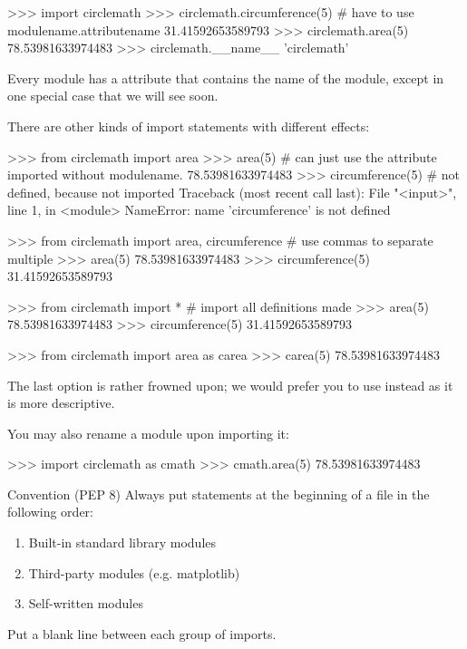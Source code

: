 \documentclass[11pt]{cselabheader}
\begin{document}
{\begin{pyconcode}
>>> import circlemath
>>> circlemath.circumference(5) # have to use modulename.attributename
31.41592653589793
>>> circlemath.area(5)
78.53981633974483
>>> circlemath.__name__
'circlemath'
\end{pyconcode}

Every module has a  attribute that contains the name of
the module, except in one special case that we will see soon.

There are other kinds of import statements with different effects:

\begin{pyconcode}
>>> from circlemath import area
>>> area(5) # can just use the attribute imported without modulename.
78.53981633974483
>>> circumference(5) # not defined, because not imported
Traceback (most recent call last):
  File "<input>", line 1, in <module>
NameError: name 'circumference' is not defined
\end{pyconcode}

\begin{pyconcode}
>>> from circlemath import area, circumference # use commas to separate multiple
>>> area(5)
78.53981633974483
>>> circumference(5)
31.41592653589793
\end{pyconcode}

\begin{pyconcode}
>>> from circlemath import * # import all definitions made
>>> area(5)
78.53981633974483
>>> circumference(5)
31.41592653589793
\end{pyconcode}

\begin{pyconcode}
>>> from circlemath import area as carea
>>> carea(5)
78.53981633974483
\end{pyconcode}

The last option is rather frowned upon; we would prefer you to use
 instead as it is more descriptive.

You may also rename a module upon importing it:

\begin{pyconcode}
>>> import circlemath as cmath
>>> cmath.area(5)
78.53981633974483
\end{pyconcode}


\begin{infobox}{Convention (PEP 8)}
  Always put  statements at the beginning of a file in the
  following order:
  \begin{enumerate}
    \item Built-in standard library modules
    \item Third-party modules (e.g. matplotlib)
    \item Self-written modules
  \end{enumerate}
  Put a blank line between each group of imports.
\end{infobox}

}
\end{document}
